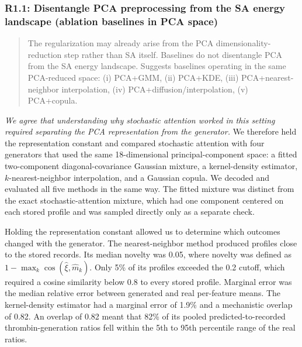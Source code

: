 \documentclass[
  11pt,
  letterpaper,
]{article}
\begin{document}
\subsubsection{R1.1: Disentangle PCA preprocessing from the SA energy landscape (ablation baselines in PCA space)}\label{r11-disentangle-pca-preprocessing-from-the-sa-energy-landscape-ablation-baselines-in-pca-space}

\begin{quote}
The regularization may already arise from the PCA dimensionality-reduction step rather than SA itself. Baselines do not disentangle PCA from the SA energy landscape. Suggests baselines operating in the same PCA-reduced space: (i) PCA+GMM, (ii) PCA+KDE, (iii) PCA+nearest-neighbor interpolation, (iv) PCA+diffusion/interpolation, (v) PCA+copula.
\end{quote}

\emph{We agree that understanding why stochastic attention worked in this setting required separating the PCA representation from the generator.} We therefore held the representation constant and compared stochastic attention with four generators that used the same 18-dimensional principal-component space: a fitted two-component diagonal-covariance Gaussian mixture, a kernel-density estimator, \(k\)-nearest-neighbor interpolation, and a Gaussian copula. We decoded and evaluated all five methods in the same way. The fitted mixture was distinct from the exact stochastic-attention mixture, which had one component centered on each stored profile and was sampled directly only as a separate check.

Holding the representation constant allowed us to determine which outcomes changed with the generator. The nearest-neighbor method produced profiles close to the stored records. Its median novelty was 0.05, where novelty was defined as \(1-\max_k\cos(\hat{\xi},\hat{m}_k)\). Only 5\% of its profiles exceeded the 0.2 cutoff, which required a cosine similarity below 0.8 to every stored profile. Marginal error was the median relative error between generated and real per-feature means. The kernel-density estimator had a marginal error of 1.9\% and a mechanistic overlap of 0.82. An overlap of 0.82 meant that 82\% of its pooled predicted-to-recorded thrombin-generation ratios fell within the 5th to 95th percentile range of the real ratios.
\end{document}
